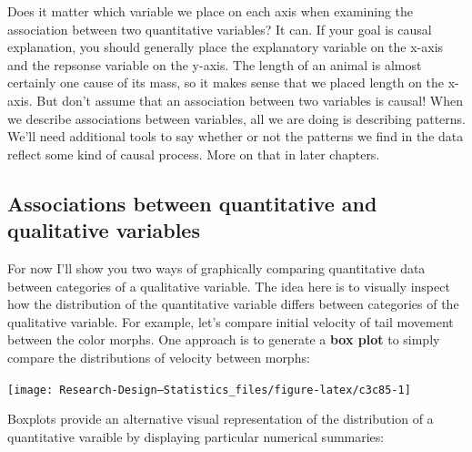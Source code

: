 \documentclass[
]{book}
\newenvironment{Shaded}{\begin{snugshade}}{\end{snugshade}}
\newcommand{\AttributeTok}[1]{\textcolor[rgb]{0.13,0.29,0.53}{#1}}
\newcommand{\FunctionTok}[1]{\textcolor[rgb]{0.13,0.29,0.53}{\textbf{#1}}}
\newcommand{\NormalTok}[1]{#1}
\newcommand{\SpecialCharTok}[1]{\textcolor[rgb]{0.81,0.36,0.00}{\textbf{#1}}}
\newcommand{\StringTok}[1]{\textcolor[rgb]{0.31,0.60,0.02}{#1}}
\begin{document}
Does it matter which variable we place on each axis when examining the association between two quantitative variables? It can. If your goal is causal explanation, you should generally place the explanatory variable on the x-axis and the repsonse variable on the y-axis. The length of an animal is almost certainly one cause of its mass, so it makes sense that we placed length on the x-axis. But don't assume that an association between two variables is causal! When we describe associations between variables, all we are doing is describing patterns. We'll need additional tools to say whether or not the patterns we find in the data reflect some kind of causal process. More on that in later chapters.

\subsection{Associations between quantitative and qualitative variables}\label{associations-between-quantitative-and-qualitative-variables}

For now I'll show you two ways of graphically comparing quantitative data between categories of a qualitative variable. The idea here is to visually inspect how the distribution of the quantitative variable differs between categories of the qualitative variable. For example, let's compare initial velocity of tail movement between the color morphs. One approach is to generate a \textbf{box plot} to simply compare the distributions of velocity between morphs:

\begin{Shaded}
\end{Shaded}

\begin{center}\texttt{[image: Research-Design---Statistics\_files/figure-latex/c3c85-1]} \end{center}

Boxplots provide an alternative visual representation of the distribution of a quantitative varaible by displaying particular numerical summaries:
\end{document}
